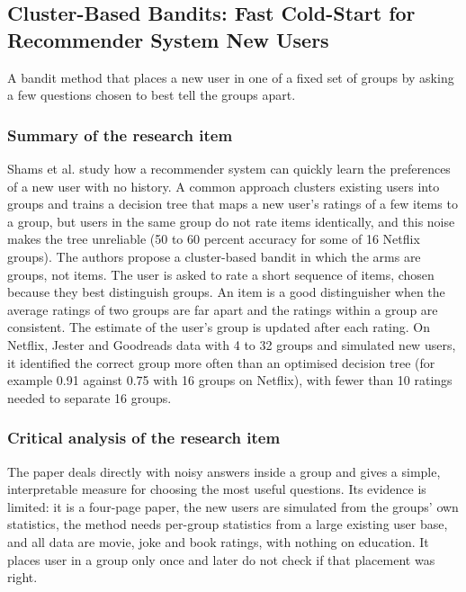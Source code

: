 \documentclass{FastFyp}
\begin{document}
\subsection{Cluster-Based Bandits: Fast Cold-Start for Recommender System New Users}
A bandit method that places a new user in one of a fixed set of groups by asking a few questions chosen to best tell the groups apart.

\subsubsection{Summary of the research item}
Shams et al. \cite{shams2021cluster} study how a recommender system can quickly learn the preferences of a new user with no history. A common approach clusters existing users into groups and trains a decision tree that maps a new user's ratings of a few items to a group, but users in the same group do not rate items identically, and this noise makes the tree unreliable (50 to 60 percent accuracy for some of 16 Netflix groups). The authors propose a cluster-based bandit in which the arms are groups, not items. The user is asked to rate a short sequence of items, chosen because they best distinguish groups. An item is a good distinguisher when the average ratings of two groups are far apart and the ratings within a group are consistent. The estimate of the user's group is updated after each rating. On Netflix, Jester and Goodreads data with 4 to 32 groups and simulated new users, it identified the correct group more often than an optimised decision tree (for example 0.91 against 0.75 with 16 groups on Netflix), with fewer than 10 ratings needed to separate 16 groups.

\subsubsection{Critical analysis of the research item}
The paper deals directly with noisy answers inside a group and gives a simple, interpretable measure for choosing the most useful questions. Its evidence is limited: it is a four-page paper, the new users are simulated from the groups' own statistics, the method needs per-group statistics from a large existing user base, and all data are movie, joke and book ratings, with nothing on education. It places user in a group only once and later do not check if that placement was right.
\end{document}
